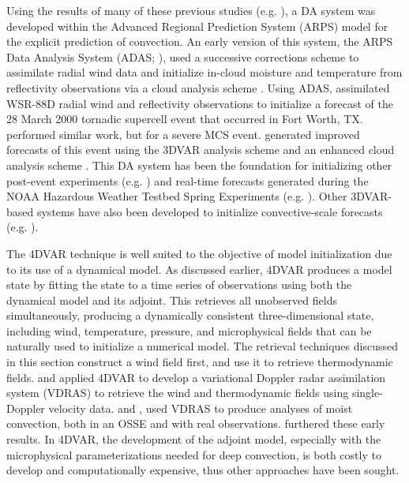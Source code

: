 Using the results of many of these previous studies (e.g. \citealt{shapiroetal95,gaoetal01}), a DA system was developed within the Advanced Regional Prediction System (ARPS) model \citep{xueetal95,xueetal00,xueetal01} for the explicit prediction of convection. An early version of this system, the ARPS Data Analysis System (ADAS; \citealt{brewster96}), used a successive corrections scheme \citet{bratseth86} to assimilate radial wind data and initialize in-cloud moisture and temperature from reflectivity observations via a cloud analysis scheme \citep{albertsetal96,zhangetal98}. Using ADAS, \citet{xueetal03} assimilated WSR-88D radial wind and reflectivity observations to initialize a forecast of the 28 March 2000 tornadic supercell event that occurred in Fort Worth, TX. \citet{dawsonxue06} performed similar work, but for a severe MCS event. \citet{huetal05,huetal06} generated improved forecasts of this event using the \citealt{gaoetal04} 3DVAR analysis scheme and an enhanced cloud analysis scheme \citep{brewster02,gaoetal02}. This DA system has been the foundation for initializing other post-event experiments (e.g. \citealt{huetal07,schenkmanetal11,xueetal13}) and real-time forecasts generated during the NOAA Hazardous Weather Testbed Spring Experiments (e.g. \citealt{xueetal08}). Other 3DVAR-based systems have also been developed to initialize convective-scale forecasts (e.g. \citealt{zhaoetal08}).

The 4DVAR technique is well suited to the objective of model initialization due to its use of a dynamical model. As discussed earlier, 4DVAR produces a model state by fitting the state to a time series of observations using both the dynamical model and its adjoint. This retrieves all unobserved fields simultaneously, producing a dynamically consistent three-dimensional state, including wind, temperature, pressure, and microphysical fields that can be naturally used to initialize a numerical model. The retrieval techniques discussed in this section construct a wind field first, and use it to retrieve thermodynamic fields. \citet{sunetal91} and \citet{suncrook94} applied 4DVAR to develop a variational Doppler radar assimilation system (VDRAS) to retrieve the wind and thermodynamic fields using single-Doppler velocity data. \citet{suncrook97} and \citet{suncrook98}, used VDRAS to produce analyses of moist convection, both in an OSSE and with real observations. \citet{wuetal00} furthered these early results. In 4DVAR, the development of the adjoint model, especially with the microphysical parameterizations needed for deep convection, is both costly to develop and computationally expensive, thus other approaches have been sought.

